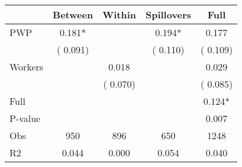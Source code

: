 
\begin{tabular}{l*{4}{c}}\hline&\multicolumn{1}{c}{Between}&\multicolumn{1}{c}{Within}&\multicolumn{1}{c}{Spillovers}&\multicolumn{1}{c}{Full}\\ \hline
 PWP           &              0.181*      &                                               &        0.194* &         0.177                            \\ 
                               &        (       0.091)           &                                       &       (       0.110)     &      (       0.109)                                           \\ 
 Workers       &                                               &        0.018    &                                &             0.029                            \\ 
                               &                                               & (       0.070)                  &                                        &      (       0.085)                                           \\ 
\hline                                                                                                                                                                                                                                            
 Full                  &                                               &                                               &                                        &             0.124*                                     \\ 
 P-value               &                                               &                                               &                                        &             0.007                                           \\ 
 Obs                   &               950               &       896                       &       650                &              1248                                               \\ 
 R2                    &                      0.044              &              0.000                      &              0.054               &                     0.040                                              \\ 
\hline \end{tabular}                                                                                                                                                                                                              